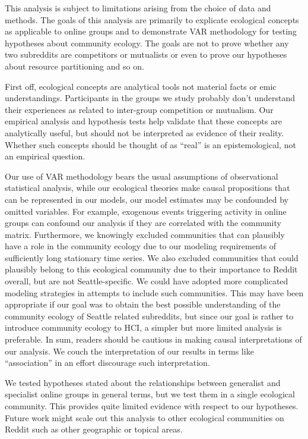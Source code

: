 \documentclass[12pt]{memoir}
\begin{document}
This analysis is subject to limitations arising from the choice of data and methods. The goals of this analysis are primarily to explicate ecological concepts as applicable to online groups and to demonstrate VAR methodology for testing hypotheses about community ecology. The goals are not to prove whether any two subreddits are competitors or mutualists or even to prove our hypotheses about resource partitioning and so on.

First off, ecological concepts are analytical tools not material facts or emic understandings.  Participants in the groups we study probably don't  understand their experiences as related to inter-group competition or mutualism.  Our empirical analysis and hypothesis tests help validate that these concepts are analytically useful, but should not be interpreted as evidence of their reality.  Whether such concepts should be thought of as ``real'' is an epistemological, not an empirical question.

Our use of VAR methodology bears the usual assumptions of observational statistical analysis, while our ecological theories make causal propositions that can be represented in our models, our model estimates may be confounded by omitted variables.  For example, exogenous events triggering activity in online groups can confound our analysis if they are correlated with the community matrix.  Furthermore, we knowingly excluded communities that can plausibly have a role in the community ecology due to our modeling requirements of sufficiently long stationary time series. We also excluded communities that could plausibly belong to this ecological community due to their importance to Reddit overall, but are not Seattle-specific. We could have adopted more complicated modeling strategies in attempts to include such communities.  This may have been appropriate if our goal was to obtain the best possible understanding of the community ecology of Seattle related subreddits, but since our goal is rather to introduce community ecology to HCI, a simpler but more limited analysis is preferable.  In sum, readers should be cautious in making causal interpretations of our analysis. We couch the interpretation of our results in terms like ``association'' in an effort discourage such interpretation.

We tested hypotheses stated about the relationships between generalist and specialist online groups in general terms, but we test them in a single ecological community.  This provides quite limited evidence with respect to our hypotheses. Future work might scale out this analysis to other ecological communities on Reddit such as other geographic or topical areas.


\setcounter{biburlnumpenalty}{9001}
\printbibliography[title = {References}, heading=secbib]
\end{document}
